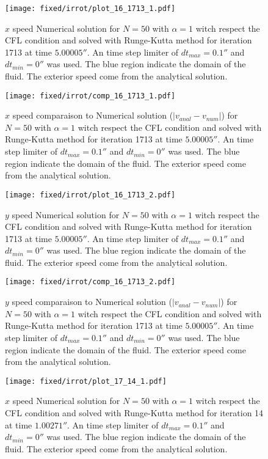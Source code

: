 \begin{figure}
\texttt{[image: fixed/irrot/plot\_16\_1713\_1.pdf]}
\caption{$x$ speed Numerical solution for $N=50$ with $\alpha=1$ witch respect the CFL condition and solved with Runge-Kutta method
for iteration 1713 at time $\unit{5.00005}{\second}$.
An time step limiter of $dt_{max}=\unit{0.1}{\second}$ and $dt_{min}=\unit{0}{\second}$ was used.
The blue region indicate the domain of the fluid. The exterior speed come from the analytical solution.
\label{fix:plot_16_1713_1}
}
\end{figure}

\begin{figure}
\texttt{[image: fixed/irrot/comp\_16\_1713\_1.pdf]}
\caption{$x$ speed comparaison to Numerical solution ($|v_{anal}-v_{num}|$) for $N=50$ with $\alpha=1$ witch respect the CFL condition and solved with Runge-Kutta method
for iteration 1713 at time $\unit{5.00005}{\second}$.
An time step limiter of $dt_{max}=\unit{0.1}{\second}$ and $dt_{min}=\unit{0}{\second}$ was used.
The blue region indicate the domain of the fluid. The exterior speed come from the analytical solution.
\label{fix:comp_16_1713_1}
}
\end{figure}

\begin{figure}
\texttt{[image: fixed/irrot/plot\_16\_1713\_2.pdf]}
\caption{$y$ speed Numerical solution for $N=50$ with $\alpha=1$ witch respect the CFL condition and solved with Runge-Kutta method
for iteration 1713 at time $\unit{5.00005}{\second}$.
An time step limiter of $dt_{max}=\unit{0.1}{\second}$ and $dt_{min}=\unit{0}{\second}$ was used.
The blue region indicate the domain of the fluid. The exterior speed come from the analytical solution.
\label{fix:plot_16_1713_2}
}
\end{figure}


\begin{figure}
\texttt{[image: fixed/irrot/comp\_16\_1713\_2.pdf]}
\caption{$y$ speed comparaison to Numerical solution ($|v_{anal}-v_{num}|$) for $N=50$ with $\alpha=1$ witch respect the CFL condition and solved with Runge-Kutta method
for iteration 1713 at time $\unit{5.00005}{\second}$.
An time step limiter of $dt_{max}=\unit{0.1}{\second}$ and $dt_{min}=\unit{0}{\second}$ was used.
The blue region indicate the domain of the fluid. The exterior speed come from the analytical solution.
\label{fix:comp_16_1713_2}
}
\end{figure}

\clearpage

\begin{figure}
\texttt{[image: fixed/irrot/plot\_17\_14\_1.pdf]}
\caption{$x$ speed Numerical solution for $N=50$ with $\alpha=1$ witch respect the CFL condition and solved with Runge-Kutta method
for iteration 14 at time $\unit{1.00271}{\second}$.
An time step limiter of $dt_{max}=\unit{0.1}{\second}$ and $dt_{min}=\unit{0}{\second}$ was used.
The blue region indicate the domain of the fluid. The exterior speed come from the analytical solution.
\label{fix:plot_17_14_1}
}
\end{figure}


